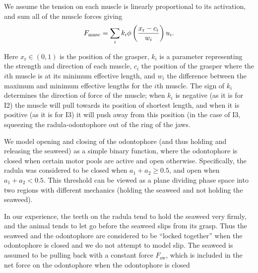 We assume the tension on each muscle is linearly proportional to its
activation, and sum all of the muscle forces giving
\begin{equation}
    F_\textrm{musc} = \sum_{
        \mathclap{i}
    }
    k_i \phi\left(\frac{x_\textrm{r} - c_i}{w_i}\right) u_i.
\end{equation}

Here  $x_\textrm{r} \in (0,1)$ is the position of the grasper, $k_i$ is a parameter
representing the strength and direction of each muscle, $c_i$ the position of the grasper
where the $i$th muscle is at its minimum effective length, and $w_i$ the
difference between the maximum and minimum effective lengths for the $i$th
muscle.  The sign of $k_i$ determines the direction of force of the muscle;
when $k_i$ is negative (as it is for I2) the muscle will pull towards its
position of shortest length, and when it is positive (as it is for I3) it
will push away from this position (in the case of I3, squeezing the
radula-odontophore out of the ring of the jaws.

We model opening and closing of the odontophore (and thus holding and releasing
the seaweed) as a simple binary function, where the odontophore is closed when
certain motor pools are active and open otherwise.  Specifically, the radula
was considered to be closed when $a_1 + a_2 \ge 0.5$, and open when $a_1 + a_2
< 0.5$.  This threshold can be viewed as a plane dividing phase space into
two regions with different mechanics (holding the seaweed and not holding the
seaweed).  

In our experience, the teeth on the radula tend to hold the seaweed very firmly,
and the animal tends to let go before the seaweed slips from its grasp.
Thus the seaweed and the odontophore are considered to be ``locked together'' when
the odontophore is closed and we do not attempt to model slip.  The seaweed is
assumed to be pulling back with a constant force $F_\textrm{sw}$, which is included in
the net force on the odontophore when the odontophore is closed

